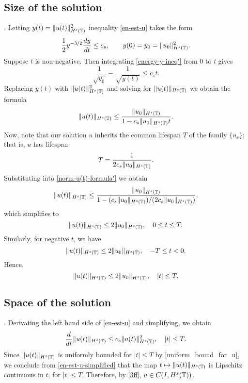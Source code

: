 	\subsection{ Size of the solution}. 
	Letting  $y(t)=  \|u(t)\|_{H^s(\mathbb{T})}^2$ inequality \eqref{en-est-u}
	takes the form
	\begin{equation} 
		\label{energy-y-ineq'}
		\frac 12
		y^{-3/2}\frac{dy}{dt}
		\le
		c_s,
		\qquad
		y(0)=y_0=  \|u_0\|_{H^s(\mathbb{T})}^2.
	\end{equation}
	Suppose $t$ is non-negative. Then integrating  \eqref{energy-y-ineq'}
	from  0 to $t$ gives
	\begin{equation*} 
		\frac{1}{\sqrt{y_0}}  - \frac{1}{\sqrt{y(t)}} 
		\le 
		c_s t.
	\end{equation*}
	Replacing $y(t)$ with   $\|u(t)\|_{H^s(\mathbb{T})}^2$  and solving for  $\|u(t)\|_{H^s(\mathbb{T})}$
	we obtain the formula
	\begin{equation} 
		\label{norm-u(t)-formula'}
		\|u(t)\|_{H^s(\mathbb{T})}
		\le
		\frac{ \|u_0\|_{H^s(\mathbb{T})}}{1-c_s\|u_0\|_{H^s(\mathbb{T})} t}.
	\end{equation}
	Now, note that our solution $u$ inherits the common lifespan $T$ of the family
	$\{u_\ee\}$; that is, $u$ has lifespan
	\begin{equation*}
		T
		=
		\frac{1}{2 c_s \|u_0\|_{H^s(\mathbb{T})}}.
	\end{equation*}
	Substituting into \eqref{norm-u(t)-formula'} we obtain	
	\begin{equation*} 
		\label{u(t)-u(0)-bound'}
		\|u(t)\|_{H^s(\mathbb{T})}
		\le
		\frac{ \|u_0\|_{H^s(\mathbb{T})}}{1-(c_s\|u_0\|_{H^s(\mathbb{T})})/(2 c_s \|u_0\|_{H^s(\mathbb{T})})},
	\end{equation*}
	which simplifies to 
	\begin{equation*}
		\|u(t)\|_{H^s(\mathbb{T})}
		\le
		2 \|u_0\|_{H^s(\mathbb{T})},
		\quad 
		0\le t \le T.
	\end{equation*}
	Similarly, for negative $t$, we have
	\begin{equation*}
		\|u(t)\|_{H^s(\mathbb{T})}
		\le
		2 \|u_0\|_{H^s(\mathbb{T})},
		\quad 
		-T \le t < 0.
	\end{equation*}
	Hence,
	\begin{equation}
		\label{uniform_bound_for_u}
		\|u(t)\|_{H^s(\mathbb{T})}
		\le
		2 \|u_0\|_{H^s(\mathbb{T})},
		\quad 
		|t| \le T.
	\end{equation}
		\subsection{ Space of the solution}.
	Derivating the left hand side of \eqref{en-est-u} and simplifying, we obtain
	\begin{equation}
		\label{en-est-u-simplified}
	\frac{d}{dt} \|u(t)\|_{H^s(\mathbb{T})} \le c_s \|u(t)\|_{H^s(\mathbb{T})}^2, \quad |t| \le T.
	\end{equation}
	Since $\|u(t)\|_{H^s(\mathbb{T})}$
	is uniformly bounded for $|t| \le T$ by
	\eqref{uniform_bound_for_u}, we conclude from
	\eqref{en-est-u-simplified} that the map $t \mapsto
	\|u(t)\|_{H^s(\mathbb{T})}$ is Lipschitz continuous in $t$, for $|t| \le T$.
	Therefore, by \eqref{3ff}, $u \in C(I, H^s(\mathbb{T}))$. 
